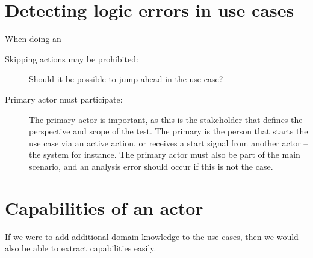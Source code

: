 


\section{Detecting logic errors in use cases}
When doing an
\begin{description}
  \item[Skipping actions may be prohibited:] Should it be possible to jump ahead in the use case?
  \item[Primary actor must participate:] The primary actor is important, as this is the stakeholder that defines the perspective and scope of the test. The primary is the person that starts the use case via an active action, or receives a start signal from another actor -- the system for instance. The primary actor must also be part of the main scenario, and an analysis error should occur if this is not the case.

\end{description}
\section{Capabilities of an actor}
If we were to add additional domain knowledge to the use cases, then we would also be able to extract capabilities easily.
